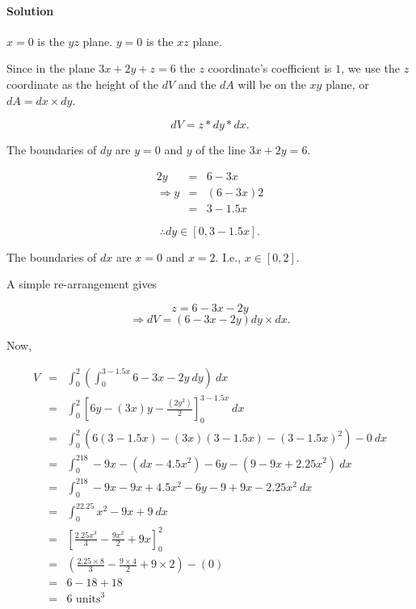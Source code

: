 

\paragraph{Solution} 

$x=0$ is the $yz$ plane. $y=0$ is the $xz$ plane.

Since in the plane $3x+2y+z=6$ the $z$ coordinate's coefficient is $1$, we use the $z$ coordinate as the height of the $dV$ and the $dA$ will be on the $xy$ plane, or $dA=dx\times dy$.

\[dV=z*dy*dx.\]

The boundaries of $dy$ are $y=0$ and $y$ of the line $3x+2y=6$.

\begin{eqnarray*}
	2y&=&6-3x\\
	\Rightarrow y&=&\left(6-3x\right)2\\
	&=&3-1.5x
\end{eqnarray*}

\[\therefore dy\in\left[0,3-1.5x\right].\]

The boundaries of $dx$ are $x=0$ and $x=2$. I.e., $x\in\left[0,2\right]$.

A simple re-arrangement gives

\[z=6-3x-2y\]
\[\Rightarrow dV=\left(6-3x-2y\right)dy\times dx.\]

Now,

\begin{eqnarray*}
	V&=&\int_0^2\left(\int_0^{3-1.5x}6-3x-2y~dy\right)~dx\\
	&=&\int_0^2\left[6y-\left(3x\right)y-\frac{\left(2y^2\right)}{2}\right]_0^{3-1.5x}~dx\\
	&=&\int_0^2\left(6\left(3-1.5x\right)-\left(3x\right)\left(3-1.5x\right)-\left(3-1.5x\right)^2\right)-0~dx\\
	&=&\int_0^218-9x-\left(dx-4.5x^2\right)-6y-\left(9-9x+2.25x^2\right)~dx\\
	&=&\int_0^218-9x-9x+4.5x^2-6y-9+9x-2.25x^2~dx\\
	&=&\int_0^22.25x^2-9x+9~dx\\
	&=&\left[\frac{2.25x^3}{3}-\frac{9x^2}{2}+9x\right]_0^2\\
	&=&\left(\frac{2.25\times8}{3}-\frac{9\times4}{2}+9\times2\right)-\left(0\right)\\
	&=&6-18+18\\
	&=&6\mbox{ units}^3
\end{eqnarray*}

